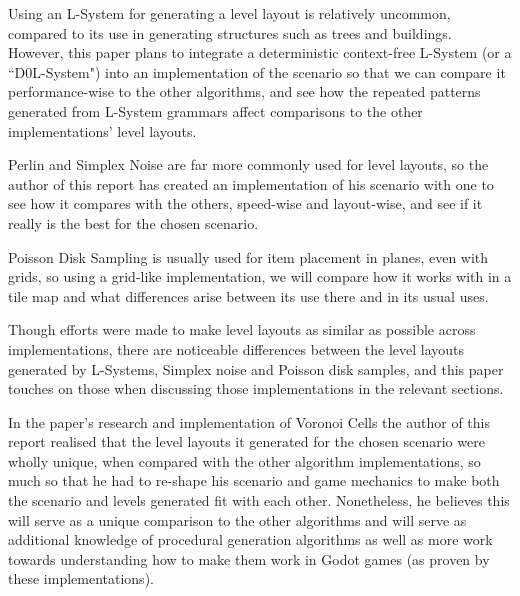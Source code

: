 Using an L-System for generating a level layout is relatively uncommon, compared to its use in generating structures such as trees and buildings. However, this paper plans to integrate a deterministic context-free L-System (or a ``D0L-System") into an implementation of the scenario so that we can compare it performance-wise to the other algorithms, and see how the repeated patterns generated from L-System grammars affect comparisons to the other implementations' level layouts. 

Perlin and Simplex Noise are far more commonly used for level layouts, so the author of this report has created an implementation of his scenario with one to see how it compares with the others, speed-wise and layout-wise, and see if it really is the best for the chosen scenario.

Poisson Disk Sampling is usually used for item placement in planes, even with grids, so using a grid-like implementation, we will compare how it works with in a tile map and what differences arise between its use there and in its usual uses.

Though efforts were made to make level layouts as similar as possible across implementations, there are noticeable differences between the level layouts generated by L-Systems, Simplex noise and Poisson disk samples, and this paper touches on those when discussing those implementations in the relevant sections.

In the paper's research and implementation of Voronoi Cells the author of this report realised that the level layouts it generated for the chosen scenario were wholly unique, when compared with the other algorithm implementations, so much so that he had to re-shape his scenario and game mechanics to make both the scenario and levels generated fit with each other. Nonetheless, he believes this will serve as a unique comparison to the other algorithms and will serve as additional knowledge of procedural generation algorithms as well as more work towards understanding how to make them work in Godot games (as proven by these implementations).